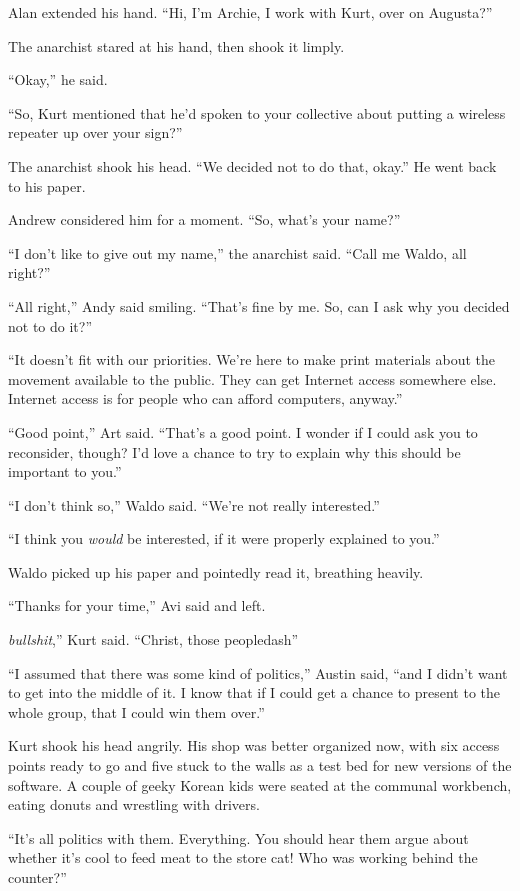 Alan extended his hand.  ``Hi, I'm Archie, I work with Kurt, over on
Augusta?''

The anarchist stared at his hand, then shook it limply.

``Okay,'' he said.

``So, Kurt mentioned that he'd spoken to your collective about putting
a wireless repeater up over your sign?''

The anarchist shook his head.  ``We decided not to do that, okay.'' He
went back to his paper.

Andrew considered him for a moment.  ``So, what's your name?''

``I don't like to give out my name,'' the anarchist said.  ``Call me
Waldo, all right?''

``All right,'' Andy said smiling.  ``That's fine by me.  So, can I ask
why you decided not to do it?''

``It doesn't fit with our priorities.  We're here to make print
materials about the movement available to the public.  They can get
Internet access somewhere else.  Internet access is for people who can
afford computers, anyway.''

``Good point,'' Art said.  ``That's a good point.  I wonder if I could
ask you to reconsider, though?  I'd love a chance to try to explain
why this should be important to you.''

``I don't think so,'' Waldo said.  ``We're not really interested.''

``I think you \textit{would} be interested, if it were properly
explained to you.''

Waldo picked up his paper and pointedly read it, breathing heavily.

``Thanks for your time,'' Avi said and left.

\textit{bullshit},'' Kurt said.  ``Christ, those peopledash{}''

``I assumed that there was some kind of politics,'' Austin said, ``and
I didn't want to get into the middle of it.  I know that if I could
get a chance to present to the whole group, that I could win them
over.''

Kurt shook his head angrily.  His shop was better organized now, with
six access points ready to go and five stuck to the walls as a test
bed for new versions of the software.  A couple of geeky Korean kids
were seated at the communal workbench, eating donuts and wrestling
with drivers.

``It's all politics with them.  Everything.  You should hear them
argue about whether it's cool to feed meat to the store cat!  Who was
working behind the counter?''

